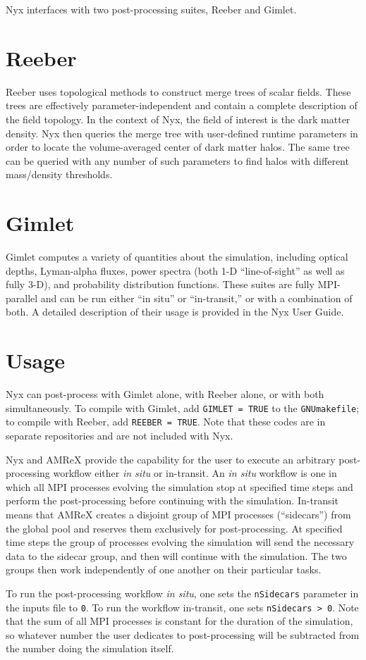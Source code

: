 Nyx interfaces with two post-processing suites, Reeber and Gimlet.

\section{Reeber}

Reeber uses topological methods to construct merge trees of scalar fields.
These trees are effectively parameter-independent and contain a complete
description of the field topology. In the context of Nyx, the field of interest
is the dark matter density. Nyx then queries the merge tree with user-defined
runtime parameters in order to locate the volume-averaged center of dark matter
halos. The same tree can be queried with any number of such parameters to find
halos with different mass/density thresholds.

\section{Gimlet}

Gimlet computes a variety of quantities about the simulation, including optical
depths, Lyman-alpha fluxes, power spectra (both 1-D ``line-of-sight'' as well as
fully 3-D), and probability distribution functions. These suites are fully
MPI-parallel and can be run either ``in situ'' or ``in-transit,'' or with a
combination of both. A detailed description of their usage is provided in the
Nyx User Guide.

\section{Usage}

Nyx can post-process with Gimlet alone, with Reeber alone, or with both
simultaneously. To compile with Gimlet, add \texttt{GIMLET = TRUE} to the
\texttt{GNUmakefile}; to compile with Reeber, add \texttt{REEBER = TRUE}. Note
that these codes are in separate repositories and are not included with Nyx.

Nyx and AMReX provide the capability for the user to execute an arbitrary
post-processing workflow either \textit{in situ} or in-transit. An \textit{in
situ} workflow is one in which all MPI processes evolving the simulation stop
at specified time steps and perform the post-processing before continuing with
the simulation. In-transit means that AMReX creates a disjoint group of MPI
processes (``sidecars'') from the global pool and reserves them exclusively for
post-processing. At specified time steps the group of processes evolving the
simulation will send the necessary data to the sidecar group, and then will
continue with the simulation. The two groups then work independently of one
another on their particular tasks.

To run the post-processing workflow \textit{in situ}, one sets the
\texttt{nSidecars} parameter in the inputs file to \texttt{0}. To run the
workflow in-transit, one sets \texttt{nSidecars > 0}. Note that the sum of all
MPI processes is constant for the duration of the simulation, so whatever
number the user dedicates to post-processing will be subtracted from the number
doing the simulation itself.

